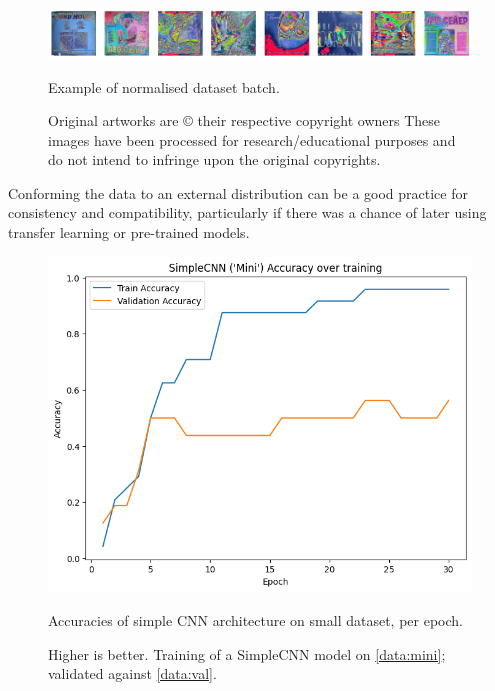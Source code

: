                 \begin{figure}[h]
                    \centering
                    \includegraphics[width=\textwidth]{images/NormalisedArts.png}
                    \caption{Example of normalised dataset batch.}
                    \label{fig:normalisedArts}
                    \caption*{
                        Original artworks are © their respective copyright owners
                        \footnotesize These images have been processed for research/educational purposes and do not intend to infringe upon the original copyrights.
                    }
                \end{figure}
    
                Conforming the data to an external distribution can be a good practice for consistency and compatibility, particularly if there was a chance of later using transfer learning or pre-trained models.
    
                \begin{figure}[h]
                    \centering
                    \includegraphics[width=\textwidth]{images/SimpleCNN-Mini_Train.png}
                    \caption{Accuracies of simple CNN architecture on small dataset, per epoch.}
                    \label{fig:SimpleCNN-Mini_Train}
                    \caption*{Higher is better. Training of a SimpleCNN model on \ref{data:mini}; validated against \ref{data:val}.}
                \end{figure}
    
